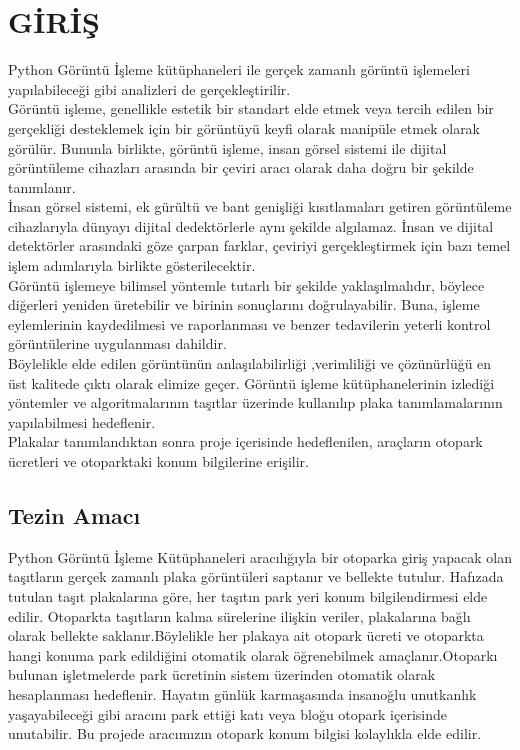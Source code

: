 \chapter{GİRİŞ}\label{CH1}
Python Görüntü İşleme kütüphaneleri ile gerçek zamanlı görüntü işlemeleri yapılabileceği gibi analizleri de gerçekleştirilir.
\\
Görüntü işleme, genellikle estetik bir standart elde etmek veya tercih edilen bir gerçekliği desteklemek için bir görüntüyü keyfi olarak manipüle etmek olarak görülür. Bununla birlikte, görüntü işleme, insan görsel sistemi ile dijital görüntüleme cihazları arasında bir çeviri aracı olarak daha doğru bir şekilde tanımlanır.
\\
İnsan görsel sistemi, ek gürültü ve bant genişliği kısıtlamaları getiren görüntüleme cihazlarıyla dünyayı dijital dedektörlerle aynı şekilde algılamaz. İnsan ve dijital detektörler arasındaki göze çarpan farklar, çeviriyi gerçekleştirmek için bazı temel işlem adımlarıyla birlikte gösterilecektir.
\\
Görüntü işlemeye bilimsel yöntemle tutarlı bir şekilde yaklaşılmalıdır, böylece diğerleri yeniden üretebilir ve birinin sonuçlarını doğrulayabilir. Buna, işleme eylemlerinin kaydedilmesi ve raporlanması ve benzer tedavilerin yeterli kontrol görüntülerine uygulanması dahildir.
\\
Böylelikle elde edilen görüntünün anlaşılabilirliği ,verimliliği ve çözünürlüğü en üst kalitede çıktı olarak elimize geçer.
Görüntü işleme kütüphanelerinin izlediği yöntemler ve algoritmalarının taşıtlar üzerinde kullanılıp plaka tanımlamalarının yapılabilmesi hedeflenir.\\
Plakalar tanımlandıktan sonra proje içerisinde hedeflenilen, araçların otopark ücretleri ve otoparktaki konum bilgilerine erişilir.
\section{Tezin Amacı}
Python Görüntü İşleme Kütüphaneleri aracılığıyla bir otoparka giriş yapacak olan taşıtların gerçek zamanlı plaka görüntüleri saptanır ve bellekte tutulur. Hafızada tutulan taşıt plakalarına göre, her taşıtın park yeri konum bilgilendirmesi elde edilir. Otoparkta taşıtların kalma sürelerine ilişkin veriler, plakalarına bağlı olarak bellekte saklanır.Böylelikle her plakaya ait otopark ücreti ve otoparkta hangi konuma park edildiğini otomatik olarak öğrenebilmek amaçlanır.Otoparkı bulunan işletmelerde park ücretinin sistem üzerinden otomatik olarak hesaplanması hedeflenir. Hayatın günlük karmaşasında insanoğlu unutkanlık yaşayabileceği gibi aracını park ettiği katı veya bloğu otopark içerisinde unutabilir. Bu projede aracımızın otopark konum bilgisi kolaylıkla elde edilir.
